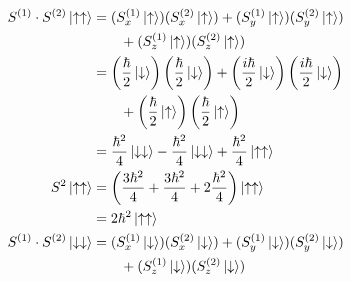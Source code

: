 \documentclass{article}
\begin{document}
\begin{enumerate}
        \begin{align*}
          S^{(1)} \cdot S^{(2)} \ket{\uparrow \uparrow}     & = (S_x^{(1)} \ket{\uparrow}) (S_x^{(2)} \ket{\uparrow}) + (S_y^{(1)} \ket{\uparrow}) (S_y^{(2)} \ket{\uparrow})                                                                                         \\
                                                            & \qquad + (S_z^{(1)} \ket{\uparrow}) (S_z^{(2)} \ket{\uparrow})                                                                                                                                          \\
                                                            & = \left( \frac{\hbar}{2} \ket{\downarrow} \right) \left( \frac{\hbar}{2} \ket{\downarrow} \right) + \left( \frac{i \hbar}{2} \ket{\downarrow} \right) \left( \frac{i \hbar}{2} \ket{\downarrow} \right) \\
                                                            & \qquad + \left( \frac{\hbar}{2} \ket{\uparrow} \right) \left( \frac{\hbar}{2} \ket{\uparrow} \right)                                                                                                    \\
                                                            & = \frac{\hbar^2}{4} \ket{\downarrow \downarrow} - \frac{\hbar^2}{4} \ket{\downarrow \downarrow} + \frac{\hbar^2}{4} \ket{\uparrow \uparrow}                                                             \\
          S^2 \ket{\uparrow \uparrow}                       & = \left( \frac{3 \hbar^2}{4} + \frac{3 \hbar^2}{4} + 2 \frac{\hbar^2}{4} \right) \ket{\uparrow \uparrow}                                                                                                \\
                                                            & = 2 \hbar^2 \ket{\uparrow \uparrow}                                                                                                                                                                     \\
          S^{(1)} \cdot S^{(2)} \ket{\downarrow \downarrow} & = (S_x^{(1)} \ket{\downarrow}) (S_x^{(2)} \ket{\downarrow}) + (S_y^{(1)} \ket{\downarrow}) (S_y^{(2)} \ket{\downarrow})                                                                                 \\
                                                            & \qquad + (S_z^{(1)} \ket{\downarrow}) (S_z^{(2)} \ket{\downarrow})                                                                                                                                      \\

\end{align*}
\end{enumerate}
\end{document}
